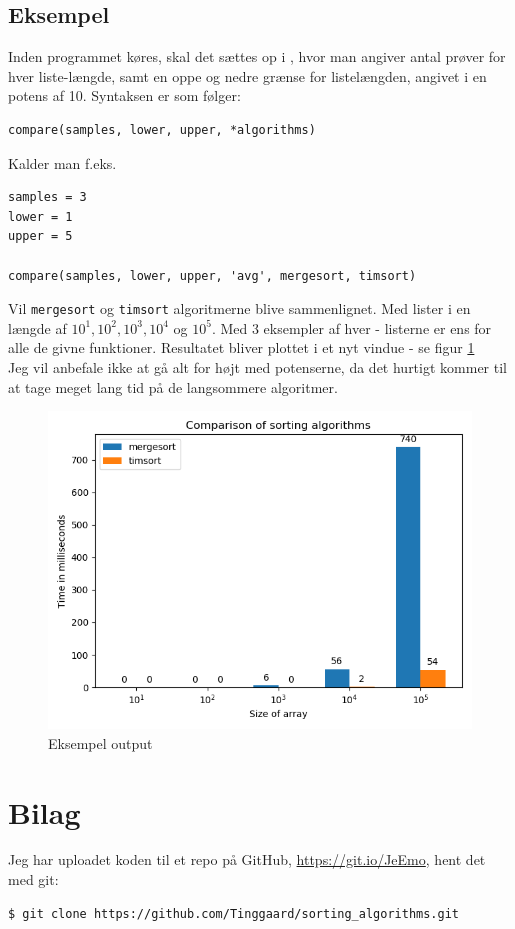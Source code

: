 \documentclass[12pt]{article}
\begin{document}
        \subsection{Eksempel}
        Inden programmet køres, skal det sættes op i , hvor man angiver antal prøver for hver liste-længde, samt en oppe og nedre grænse for listelængden, angivet i en potens af 10. Syntaksen er som følger:
        \newline
        \begin{verbatim}
compare(samples, lower, upper, *algorithms)
        \end{verbatim}
        Kalder man f.eks.
        \begin{verbatim}
samples = 3
lower = 1
upper = 5

compare(samples, lower, upper, 'avg', mergesort, timsort)
        \end{verbatim}
        Vil \texttt{mergesort} og \texttt{timsort} algoritmerne blive sammenlignet. Med lister i en længde af $10^1, 10^2, 10^3, 10^4$ og $10^5$. Med $3$ eksempler af hver - listerne er ens for alle de givne funktioner.
        Resultatet bliver plottet i et nyt vindue - se figur \ref{fig:figur1}\\
        Jeg vil anbefale ikke at gå alt for højt med potenserne, da det hurtigt kommer til at tage meget lang tid på de langsommere algoritmer.


        \begin{figure}
            \center
            \includegraphics[width=.7\linewidth]{figur1.png}
            \caption{Eksempel output}
            \label{fig:figur1}
        \end{figure}


    \section{Bilag}
    Jeg har uploadet koden til et repo på GitHub, \url{https://git.io/JeEmo}, hent det med git:
    \begin{verbatim}
$ git clone https://github.com/Tinggaard/sorting_algorithms.git
    \end{verbatim}
\end{document}
